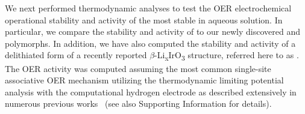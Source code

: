 %



%
%
We next performed  thermodynamic analyses to test the OER electrochemical operational stability and activity of the most stable \IrOx in aqueous solution.
%
In particular, we compare the stability and activity of \rIrOtwo to our newly discovered \aIrOthree and \rIrOthree polymorphs.
%
In addition, we have also computed the stability and activity of a delithiated form of a recently reported $\beta$-Li\textsubscript{x}IrO\textsubscript{3} structure, referred here to as \bIrOthree.~\cite{Pearce2017,Pearce2019}
%
The OER activity was computed assuming the most common single-site associative OER mechanism utilizing the thermodynamic limiting potential analysis with the computational hydrogen electrode as described extensively in numerous previous works~\cite{Man2011,Rossmeisl2007,Kitchin2004,Bajdich2013}
(see also Supporting Information for details).


